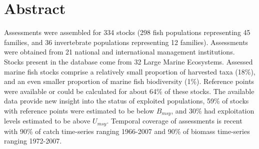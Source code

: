 \section*{Abstract}

Assessments were assembled for 334 stocks
(298 fish populations representing
45 families, and 36
invertebrate populations representing 12
families). Assessments were obtained from 21 national
and international management institutions. Stocks
present in the database come from 32 Large
Marine Ecosystems. Assessed marine fish stocks
comprise a relatively small proportion of harvested taxa
(18\%), and an even smaller proportion of
marine fish biodiversity (1\%). Reference
points were available or could be calculated for about
64\% of these stocks. The available data
provide new insight into the status of exploited populations,
59\% of stocks with reference points
were estimated to be below $B_{msy}$, and
30\% had exploitation levels
estimated to be above $U_{msy}$. Temporal coverage of assessments is
recent with 90\% of catch time-series ranging 1966-2007
and 90\% of biomass time-series ranging 1972-2007.


